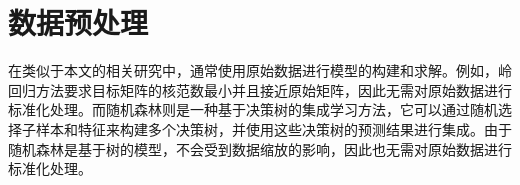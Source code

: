 
\section{数据预处理}

在类似于本文的相关研究中，通常使用原始数据进行模型的构建和求解。例如，岭回归方法要求目标矩阵的核范数最小并且接近原始矩阵，因此无需对原始数据进行标准化处理。而随机森林则是一种基于决策树的集成学习方法，它可以通过随机选择子样本和特征来构建多个决策树，并使用这些决策树的预测结果进行集成。由于随机森林是基于树的模型，不会受到数据缩放的影响，因此也无需对原始数据进行标准化处理。

